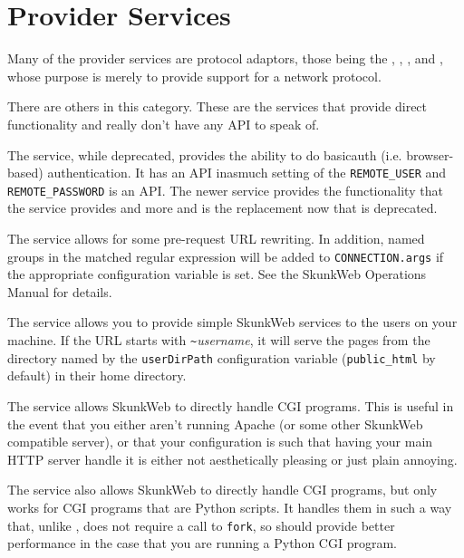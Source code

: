 \documentclass{manual}
\begin{document}
\section{Provider Services}
Many of the provider services are protocol adaptors, those being the
, , , 
and , whose purpose is merely to provide support for a
network protocol.

There are others in this category.  These are the services that
provide direct functionality and really don't have any API to speak of.

The  service, while deprecated, provides the
ability to do basicauth (i.e. browser-based) authentication.  It has
an API inasmuch setting of the
\texttt{REMOTE_USER} and
\texttt{REMOTE_PASSWORD} is an API.
The newer  service provides the functionality that the
 service provides and more and is the replacement
now that  is deprecated.

The  service allows for some pre-request URL
rewriting.  In addition, named groups in the matched regular
expression will be added to \texttt{CONNECTION.args} if the
appropriate configuration variable is set.  See the SkunkWeb
Operations Manual for details.

The  service allows you to provide simple SkunkWeb
services to the users on your machine.  If the URL starts with
\texttt{\~}\emph{username}, it will serve the pages from the directory
named by the \texttt{userDirPath} configuration variable
(\texttt{public_html} by default) in their home directory.

The  service allows SkunkWeb to directly handle CGI
programs.  This is useful in the event that you either aren't running
Apache (or some other SkunkWeb compatible server), or that your
configuration is such that having your main HTTP server handle it is
either not aesthetically pleasing or just plain annoying.

The  service also allows SkunkWeb to directly handle
CGI programs, but  only works for CGI programs that are
Python scripts.  It handles them in such a way that, unlike
, does not require a call to \texttt{fork}, so should
provide better performance in the case that you are running a Python
CGI program.
\end{document}
